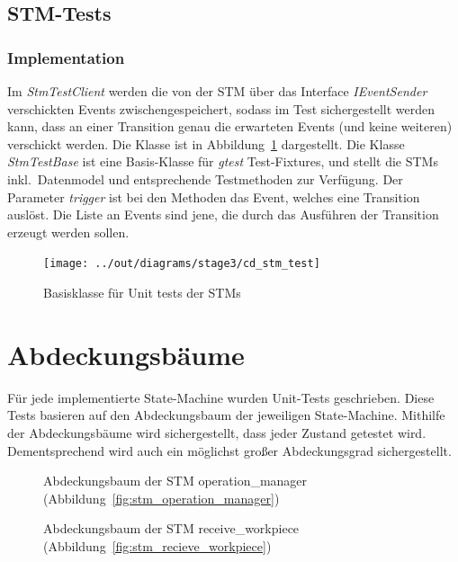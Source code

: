\subsection{STM-Tests}\label{subsec:stm-tests}

\subsubsection{Implementation}
Im \textit{StmTestClient} werden die von der STM über das Interface \textit{IEventSender}
verschickten Events zwischengespeichert, sodass im Test
sichergestellt werden kann, dass an einer Transition genau die erwarteten Events (und keine weiteren)
verschickt werden.
Die Klasse ist in Abbildung~\ref{fig:cd_basis_stm_test} dargestellt.
Die Klasse \textit{StmTestBase} ist eine Basis-Klasse für \textit{gtest} Test-Fixtures,
und stellt die STMs inkl.\ Datenmodel und entsprechende Testmethoden zur Verfügung.
Der Parameter \textit{trigger} ist bei den Methoden das Event, welches eine Transition auslöst.
Die Liste an Events sind jene, die durch das Ausführen der Transition erzeugt werden sollen.

\begin{figure}[h]
    \centering
    \texttt{[image: ../out/diagrams/stage3/cd\_stm\_test]}
    \caption{Basisklasse für Unit tests der STMs}
    \label{fig:cd_basis_stm_test}
\end{figure}


\section{Abdeckungsbäume}\label{sec:abdeckungsbaueme}

Für jede implementierte State-Machine wurden Unit-Tests geschrieben.
Diese Tests basieren auf den Abdeckungsbaum der jeweiligen State-Machine.
Mithilfe der Abdeckungsbäume wird sichergestellt, dass jeder Zustand getestet wird.
Dementsprechend wird auch ein möglichst großer Abdeckungsgrad sichergestellt.

\begin{figure}
    \caption{Abdeckungsbaum der STM operation\_manager
        (Abbildung~\ref{fig:stm_operation_manager})}
    \label{fig:tt_operation_manager}
\end{figure}

\begin{figure}
    \caption{Abdeckungsbaum der STM receive\_workpiece
        (Abbildung~\ref{fig:stm_recieve_workpiece})}
    \label{fig:tt_recieve_workpiece}
\end{figure}


